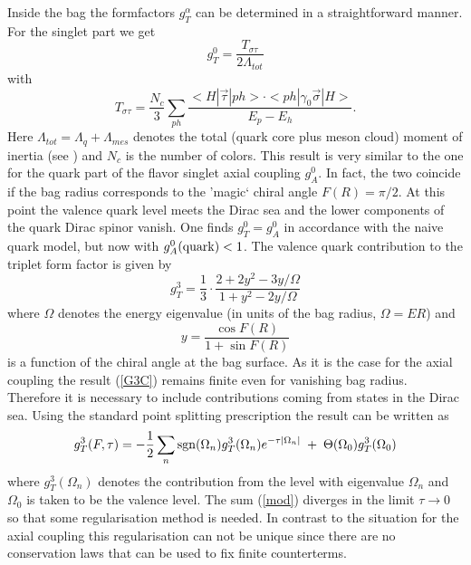 Inside the bag the formfactors $g_T^{\alpha}$ can be determined in a 
straightforward manner. For the singlet part we get
\begin{equation}
\label{G0C}
g_T^{0}=\frac{T_{\sigma\tau}}{2\Lambda_{tot}}
\end{equation}
with
\begin{equation}
T_{\sigma\tau}=\frac{N_c}{3}\sum_{ph}
\frac{<H|\vec{\tau}|ph>\cdot<ph|\gamma_0\vec{\sigma}|H>}{E_p-E_h}.
\end{equation}
Here $\Lambda_{tot}=\Lambda_{q}+\Lambda_{mes}$ denotes the total 
(quark core plus meson cloud) moment
of inertia (see  \cite{Hos}) and $N_c$ is the number of colors.
This result is very similar to the one for the quark part of the flavor
singlet axial coupling $g_A^0$. In fact, the two coincide if the bag radius
corresponds to the 'magic` chiral angle $F(R)=\pi/2$. At this point the
valence  quark level meets the Dirac sea and the lower components of the quark
Dirac spinor vanish. One finds $g_T^0=g_A^0$ in accordance with the naive
quark model, but now with $g_A^0({\rm quark}) <1$.
The valence quark contribution to the triplet form factor is given by
\begin{equation}
\label{G3C}
g_T^{3}=\frac{1}{3}\cdot\frac{2+2y^2-3y/\Omega}{1+y^2-2y/\Omega}
\end{equation}
where $\Omega$ denotes the energy eigenvalue (in units of the bag radius,
$\Omega=ER$) and
\begin{equation}
\label{y}
y=\frac{\cos F(R)}{1+\sin F(R)}
\end{equation}
is a function of the chiral angle at the bag surface. As it is the case
for the axial coupling the result (\ref{G3C}) remains finite even for 
vanishing bag radius. Therefore it is  necessary to include 
contributions coming from states in the Dirac sea. Using the standard
point splitting prescription  the result can be written as
\begin{equation}
\label{mod}
g_T^{3}(F,\tau)=-\frac{1}{2}\sum_n {\rm sgn}(\Omega_n)g_T^{3}
(\Omega_n)e^{-\tau|\Omega_n|}\;+\;\Theta(\Omega_0)g_T^{3}(\Omega_0)
\end{equation}
where $g_T^{3}(\Omega_n)$ denotes the contribution from the level with
eigenvalue $\Omega_n$ and $\Omega_0$ is taken to be the valence level. The
sum (\ref{mod}) diverges in the limit $\tau\rightarrow 0$ so that some
regularisation method is needed. In contrast to the situation for the axial
coupling this regularisation can not be unique since there are no 
conservation laws that can be used to fix finite counterterms. 
